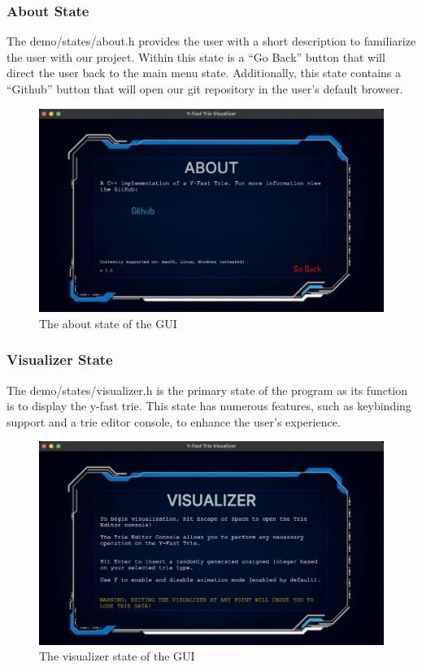 \documentclass{article}
\begin{document}
\subsubsection{About State}
The demo/states/about.h provides the user with a short description to familiarize the user with our project. Within this state is a “Go Back” button that will direct the user back to the main menu state. Additionally, this state contains a “Github” button that will open our git repository in the user’s default browser.

\begin{figure}[h]
    \centering
    \includegraphics[width = 12cm]{github.png}
    \caption{The about state of the GUI}
\end{figure}

\subsubsection{Visualizer State}
The demo/states/visualizer.h is the primary state of the program as its function is to display the y-fast trie. This state has numerous features, such as keybinding support and a trie editor console, to enhance the user’s experience.
\\

\begin{figure}[h]
    \centering
    \includegraphics[width = 12cm]{tutorial.png}
    \caption{The visualizer state of the GUI}
\end{figure}
\end{document}
